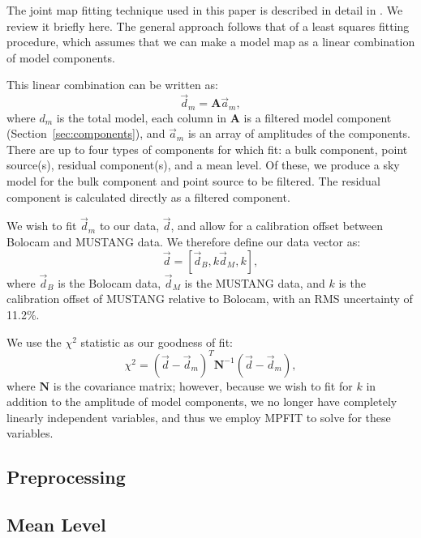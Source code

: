\documentclass[iop,numberedappendix,apj]{emulateapj}
\begin{document}
{The joint map fitting technique used in this paper is described in detail in \citet{romero2015a}. We review
it briefly here. The general approach follows that of a least squares fitting procedure, which assumes that
we can make a model map as a linear combination of model components. 

This linear combination can be written as:
\begin{equation}
  \vec{d}_m = \mathbf{A} \vec{a}_m,
\end{equation}
where $d_m$ is the total model, each column in $\mathbf{A}$ is a filtered model component (Section~\ref{sec:components}), 
and $\vec{a}_m$ is 
an array of amplitudes of the components. There are up to four types of components for which fit: 
a bulk component, point source(s), residual component(s), and a mean level. Of these, we produce a
sky model for the bulk component and point source to be filtered. The residual component is calculated 
directly as a filtered component.

We wish to fit $\vec{d}_m$ to our data, $\vec{d}$, and allow for a calibration offset between Bolocam and
MUSTANG data. We therefore define our data vector as:
\begin{equation}
  \vec{d} = [ \vec{d}_{B}, k \vec{d}_{M}, k ] ,
\end{equation}
where $\vec{d}_{B}$ is the Bolocam data, $\vec{d}_{M}$ is the MUSTANG data, and $k$ is the calibration offset of
MUSTANG relative to Bolocam, with an RMS uncertainty of 11.2\%.

We use the $\chi^2$ statistic as our goodness of fit:
\begin{equation}
  \chi^2 = (\overrightarrow{d} - \overrightarrow{d}_m)^T \mathbf{N}^{-1} (\overrightarrow{d} - \overrightarrow{d}_m),
\end{equation}
where $\mathbf{N}$ is the covariance matrix; however, because we wish to fit for $k$ in addition to the 
amplitude of model components, we no longer have
completely linearly independent variables, and thus we employ MPFIT \citep{markwardt2009} to solve for these
variables.

\subsection{Preprocessing}

\subsection{Mean Level}
\label{sec:mean_level}

}
\end{document}
